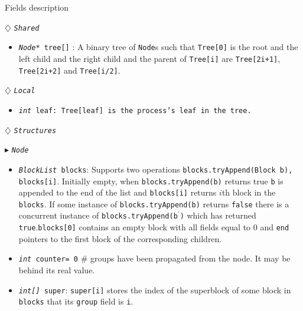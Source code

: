 \documentclass[10pt]{article}
\renewcommand{\tt}[1]{\texttt{#1}}
\renewcommand{\sl}[1]{\textsl{#1}}
\renewcommand{\bf}[1]{\textbf{#1}}
\theoremstyle{definition}
\begin{document}
\begin{algorithm}
\caption{Fields description}
\begin{algorithmic}[1]
\setcounter{ALG@line}{100}
\begin{multicols}{2}


\Statex $\diamondsuit$ \tt{\sl{Shared}}
\begin{itemize}
\item \tt{\sl{Node*} tree[]} \textsf{: A binary tree of \tt{Node}s such that \tt{Tree[0]} is the root and the left child and the right child and the parent of \tt{Tree[i]} are \tt{Tree[2i+1]}, \tt{Tree[2i+2]} and \tt{Tree[i/2]}.}
\end{itemize}

\Statex

\Statex $\diamondsuit$ \tt{\sl{Local}}
\begin{itemize}
\item \tt{\sl{int} leaf\textsf{: \tt{Tree[leaf]} is the process's leaf in the tree.}}
\end{itemize}

\Statex
\Statex $\diamondsuit$ \tt{\sl{Structures}}

\Statex $\blacktriangleright$ \tt{\sl{Node}}
\begin{itemize}
\item \tt{\sl{BlockList} blocks}\textsf{: Supports two operations \tt{blocks.tryAppend(Block b), blocks[i]}. Initially  empty, when \tt{blocks.tryAppend(b)} returns true \tt{b} is appended to the end of the list and \tt{blocks[i]} returns $i$th block in the \tt{blocks}. If some instance of \tt{blocks.tryAppend(b)} returns \tt{false} there is a concurrent instance of \tt{blocks.tryAppend(b$^\prime$)} which has returned \tt{true}.\tt{blocks[0]} contains an empty block with all fields equal to 0 and \tt{end} pointers to the first block of the corresponding children.}

\item \tt{\sl{int} counter= 0}\textsf{} \textsf{\# groups have been propagated from the node. It may be behind its real value.}
\item \tt{\sl{int[]} super}\textsf{: \tt{super[i]} stores the index of the superblock of some block in \tt{blocks} that its \tt{group} field is \tt{i}.}
\end{itemize}


\end{multicols}
\end{algorithmic}
\end{algorithm}
\end{document}
